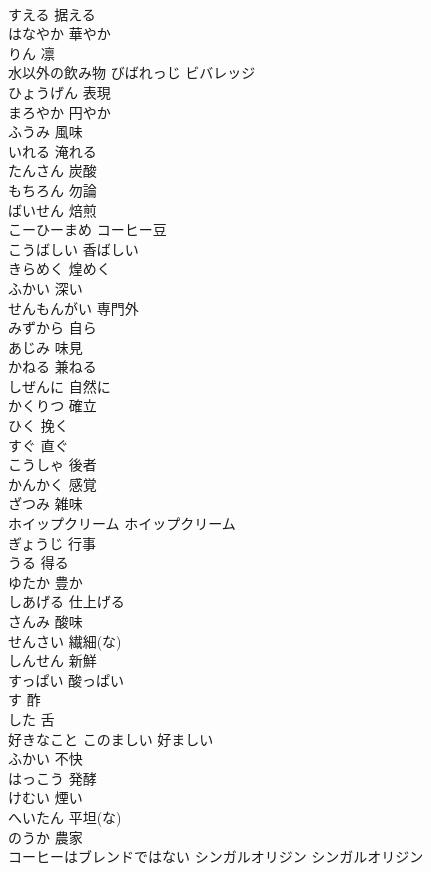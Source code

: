 \documentclass[8pt]{extreport}
\begin{document}
\begin{CJK}{UTF8}{min}
\\	すえる	据える
\\	はなやか	華やか
\\	りん	凛
\\	水以外の飲み物	びばれっじ	ビバレッジ
\\	ひょうげん	表現
\\	まろやか	円やか
\\	ふうみ	風味
\\	いれる	淹れる
\\	たんさん	炭酸
\\	もちろん	勿論
\\	ばいせん	焙煎
\\	こーひーまめ	コーヒー豆
\\	こうばしい	香ばしい
\\	きらめく	煌めく
\\	ふかい	深い
\\	せんもんがい	専門外
\\	みずから	自ら
\\	あじみ	味見
\\	かねる	兼ねる
\\	しぜんに	自然に
\\	かくりつ	確立
\\	ひく	挽く
\\	すぐ	直ぐ
\\	こうしゃ	後者
\\	かんかく	感覚
\\	ざつみ	雑味
\\	ホイップクリーム	ホイップクリーム
\\	ぎょうじ	行事
\\	うる	得る
\\	ゆたか	豊か
\\	しあげる	仕上げる
\\	さんみ	酸味
\\	せんさい	繊細(な)
\\	しんせん	新鮮
\\	すっぱい	酸っぱい
\\	す	酢
\\	した	舌
\\	好きなこと	このましい	好ましい
\\	ふかい	不快
\\	はっこう	発酵
\\	けむい	煙い
\\	へいたん	平坦(な)
\\	のうか	農家
\\	コーヒーはブレンドではない	シンガルオリジン	シンガルオリジン

\end{CJK}
\end{document}
